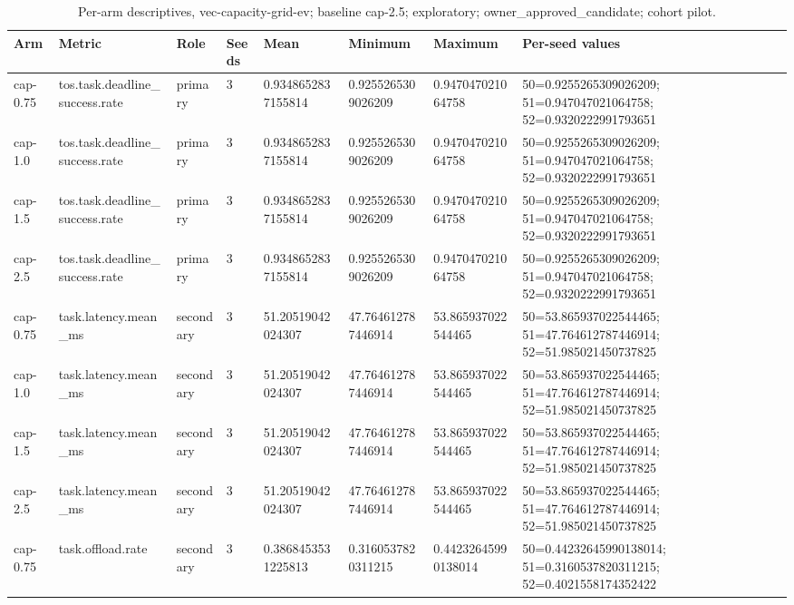{
\begin{table}[htbp]
\centering
\caption{Per-arm descriptives, vec-capacity-grid-ev; baseline cap-2.5; exploratory; owner\_approved\_candidate; cohort pilot.}
\label{tab:traffictwin-metrics-edb00e16d412}
\small
\renewcommand{\arraystretch}{1.15}
\begin{tabular}{llllllll}
\hline
Arm & Metric & Role & Seeds & Mean & Minimum & Maximum & Per-seed values \\
\hline
cap-0.75 & tos.task.deadline\_success.rate & primary & 3 & 0.9348652837155814 & 0.9255265309026209 & 0.947047021064758 & 50=0.9255265309026209; 51=0.947047021064758; 52=0.9320222991793651 \\
cap-1.0 & tos.task.deadline\_success.rate & primary & 3 & 0.9348652837155814 & 0.9255265309026209 & 0.947047021064758 & 50=0.9255265309026209; 51=0.947047021064758; 52=0.9320222991793651 \\
cap-1.5 & tos.task.deadline\_success.rate & primary & 3 & 0.9348652837155814 & 0.9255265309026209 & 0.947047021064758 & 50=0.9255265309026209; 51=0.947047021064758; 52=0.9320222991793651 \\
cap-2.5 & tos.task.deadline\_success.rate & primary & 3 & 0.9348652837155814 & 0.9255265309026209 & 0.947047021064758 & 50=0.9255265309026209; 51=0.947047021064758; 52=0.9320222991793651 \\
cap-0.75 & task.latency.mean\_ms & secondary & 3 & 51.20519042024307 & 47.764612787446914 & 53.865937022544465 & 50=53.865937022544465; 51=47.764612787446914; 52=51.985021450737825 \\
cap-1.0 & task.latency.mean\_ms & secondary & 3 & 51.20519042024307 & 47.764612787446914 & 53.865937022544465 & 50=53.865937022544465; 51=47.764612787446914; 52=51.985021450737825 \\
cap-1.5 & task.latency.mean\_ms & secondary & 3 & 51.20519042024307 & 47.764612787446914 & 53.865937022544465 & 50=53.865937022544465; 51=47.764612787446914; 52=51.985021450737825 \\
cap-2.5 & task.latency.mean\_ms & secondary & 3 & 51.20519042024307 & 47.764612787446914 & 53.865937022544465 & 50=53.865937022544465; 51=47.764612787446914; 52=51.985021450737825 \\
cap-0.75 & task.offload.rate & secondary & 3 & 0.3868453531225813 & 0.3160537820311215 & 0.44232645990138014 & 50=0.44232645990138014; 51=0.3160537820311215; 52=0.4021558174352422 \\

\end{tabular}
\end{table}}
